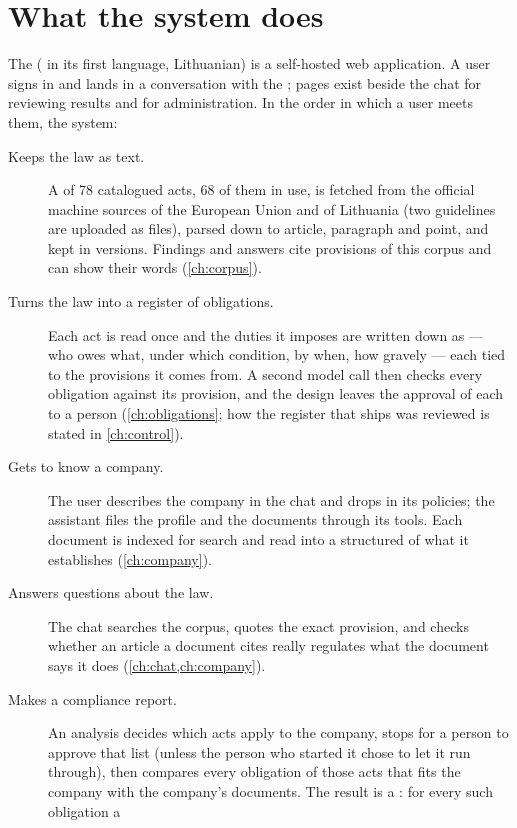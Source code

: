 \section{What the system does}\label{sec:intro:does}

The \product{} (\lt{\productlt} in its first language, Lithuanian) is a self-hosted web
application. A user signs in and lands in a conversation with the ; pages
exist beside the chat for reviewing results and for administration. In the order in which a
user meets them, the system:

\begin{description}
  \item[Keeps the law as text.] A  of 78 catalogued acts, 68 of them in
    use, is fetched from the official machine sources of the European Union and of Lithuania
    (two guidelines are uploaded as files), parsed down to article, paragraph and point, and
    kept in versions. Findings and answers cite provisions of this corpus and can show their
    words (\cref{ch:corpus}).
  \item[Turns the law into a register of obligations.] Each act is read once and the duties it
    imposes are written down as  --- who owes what, under which condition, by
    when, how gravely --- each tied to the provisions it comes from. A second model call then checks
    every obligation against its provision, and the design leaves the approval of each to a
    person (\cref{ch:obligations}; how the register that ships was reviewed is stated in
    \cref{ch:control}).
  \item[Gets to know a company.] The user describes the company in the chat and drops in its
    policies; the assistant files the profile and the documents through its tools. Each
    document is indexed for search and read into a structured  of what it
    establishes (\cref{ch:company}).
  \item[Answers questions about the law.] The chat searches the corpus, quotes the exact
    provision, and checks whether an article a document cites really regulates what the
    document says it does (\cref{ch:chat,ch:company}).
  \item[Makes a compliance report.] An analysis decides which acts apply to the company,
    stops for a person to approve that list (unless the person who started it chose to let it
    run through), then compares every obligation of those acts that fits the company with the company's documents. The result is a : for every such obligation a 

\end{description}
